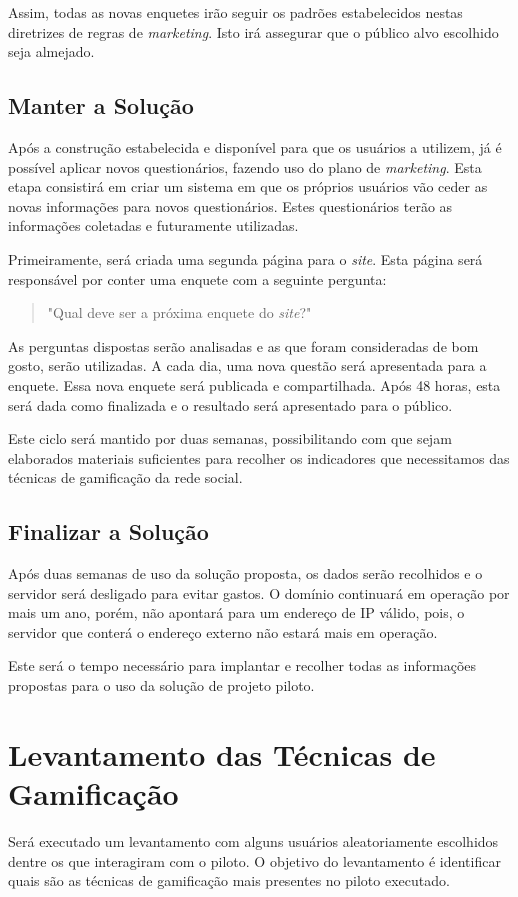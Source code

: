 Assim, todas as novas enquetes irão seguir os padrões estabelecidos nestas diretrizes de regras de \textit{marketing}. Isto irá assegurar que
o público alvo escolhido seja almejado.


\subsection{Manter a Solução}
\label{sub:definir_tecnologia}
Após a construção estabelecida e disponível para que os usuários a utilizem, já é possível aplicar novos questionários, fazendo uso do plano de \textit{marketing}.
Esta etapa consistirá em criar um sistema em que os próprios usuários vão ceder as novas informações para novos questionários. Estes questionários 
terão as informações coletadas e futuramente utilizadas.

Primeiramente, será criada uma segunda página para o \textit{site}. Esta página será responsável por conter uma enquete com a seguinte pergunta:

 \begin{quote}
     "Qual deve ser a próxima enquete do \textit{site}?"
 \end{quote}

As perguntas dispostas serão analisadas e as que foram consideradas de bom gosto, serão utilizadas. A cada dia, uma nova questão será apresentada
para a enquete. Essa nova enquete será publicada e compartilhada. Após 48 horas, esta será dada como finalizada e o resultado será apresentado
para o público. 

Este ciclo será mantido por duas semanas, possibilitando com que sejam elaborados materiais suficientes para recolher os indicadores que necessitamos 
das técnicas de gamificação da rede social.
\subsection{Finalizar a Solução}
\label{sub:definir_tecnologia}

Após duas semanas de uso da solução proposta, os dados serão recolhidos e o servidor será desligado para evitar gastos. O domínio continuará em operação
por mais um ano, porém, não apontará para um endereço de IP válido, pois, o servidor que conterá o endereço externo não estará mais em operação.

Este será o tempo necessário para implantar e recolher todas as informações propostas para o uso da solução de projeto piloto.

\section{Levantamento das Técnicas de Gamificação}
\label{sub:survey_para_t_cnicas_de_gamifica_o}
Será executado um levantamento com alguns usuários aleatoriamente escolhidos dentre os que interagiram com o piloto.
O objetivo do levantamento é identificar quais são as técnicas de gamificação mais presentes no piloto executado.

